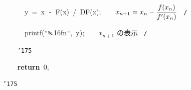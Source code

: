 \documentclass[a4paper,10pt]{article}
\def\mc{\relax}
\begin{document}
\noindent
\mbox{}{\tt\mc \ }{\tt\mc \ }{\tt\mc \ }{\tt\mc \ }{\tt\mc \ }{\tt\mc \ }y{\tt\mc \ }={\tt\mc \ }x{\tt\mc \ }{\tt -}{\tt\mc \ }F(x){\tt\mc \ }/{\tt\mc \ }DF(x);{\tt\mc \ }{\tt\mc \ }{\tt\mc \ }\rm\mc {\tt /}{\tt *}\  $\displaystyle x_{n+1}=x_n - {f(x_n)\over f'(x_n)}$ \hfill \rm\mc \ {\tt *}{\tt /}
\tt\mc 

\noindent
\mbox{}{\tt\mc \ }{\tt\mc \ }{\tt\mc \ }{\tt\mc \ }{\tt\mc \ }{\tt\mc \ }printf({\tt "}{\tt\%}.16f{\tt{}}n{\tt "},{\tt\mc \ }y);{\tt\mc \ }{\tt\mc \ }{\tt\mc \ }\rm\mc {\tt /}{\tt *}\  $x_{n+1}$ の表示 \hfill \rm\mc \ {\tt *}{\tt /}
\tt\mc 

\noindent
\mbox{}{\tt\mc \ }{\tt\mc \ }{\tt\mc \ }{\tt\mc \ }{\tt\char'175}

\noindent
\mbox{}{\tt\mc \ }{\tt\mc \ }{\tt\mc \ }{\tt\mc \ }\textbf{return}{\tt\mc \ }0;

\noindent
\mbox{}{\tt\char'175}

\rm\mc
\end{document}

